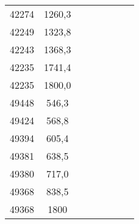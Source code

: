 \documentclass[11pt]{article}
\begin{document}
{{\begin{tabular}{|c|c|c|c|c|c|c|c|}
            \cline{1-2} 
            42274 & 1260,3 &  & \multicolumn{1}{c}{} & \multicolumn{1}{c}{} & \multicolumn{1}{c}{} &  & \tabularnewline
            \cline{1-2} 
            42249 & 1323,8 &  & \multicolumn{1}{c}{} & \multicolumn{1}{c}{} & \multicolumn{1}{c}{} &  & \tabularnewline
            \cline{1-2} 
            42243 & 1368,3 &  & \multicolumn{1}{c}{} & \multicolumn{1}{c}{} & \multicolumn{1}{c}{} &  & \tabularnewline
            \cline{1-2} 
            42235 & 1741,4 &  & \multicolumn{1}{c}{} & \multicolumn{1}{c}{} & \multicolumn{1}{c}{} &  & \tabularnewline
            \cline{1-2} 
            42235 & 1800,0 &  & \multicolumn{1}{c}{} & \multicolumn{1}{c}{} & \multicolumn{1}{c}{} &  & \tabularnewline
            \cline{1-2} 
            49448 & 546,3 &  & \multicolumn{1}{c}{} & \multicolumn{1}{c}{} & \multicolumn{1}{c}{} &  & \tabularnewline
            \cline{1-2} 
            49424 & 568,8 &  & \multicolumn{1}{c}{} & \multicolumn{1}{c}{} & \multicolumn{1}{c}{} &  & \tabularnewline
            \cline{1-2} 
            49394 & 605,4 &  & \multicolumn{1}{c}{} & \multicolumn{1}{c}{} & \multicolumn{1}{c}{} &  & \tabularnewline
            \cline{1-2} 
            49381 & 638,5 &  & \multicolumn{1}{c}{} & \multicolumn{1}{c}{} & \multicolumn{1}{c}{} &  & \tabularnewline
            \cline{1-2} 
            49380 & 717,0 &  & \multicolumn{1}{c}{} & \multicolumn{1}{c}{} & \multicolumn{1}{c}{} &  & \tabularnewline
            \cline{1-2} 
            49368 & 838,5 &  & \multicolumn{1}{c}{} & \multicolumn{1}{c}{} & \multicolumn{1}{c}{} &  & \tabularnewline
            \cline{1-2} 
            49368 & 1800 &  & \multicolumn{1}{c}{} & \multicolumn{1}{c}{} & \multicolumn{1}{c}{} &  & \tabularnewline
            \cline{1-2} 
        \end{tabular}
    }
}
\vspace*{\fill}\vspace*{\fill}
\end{document}
